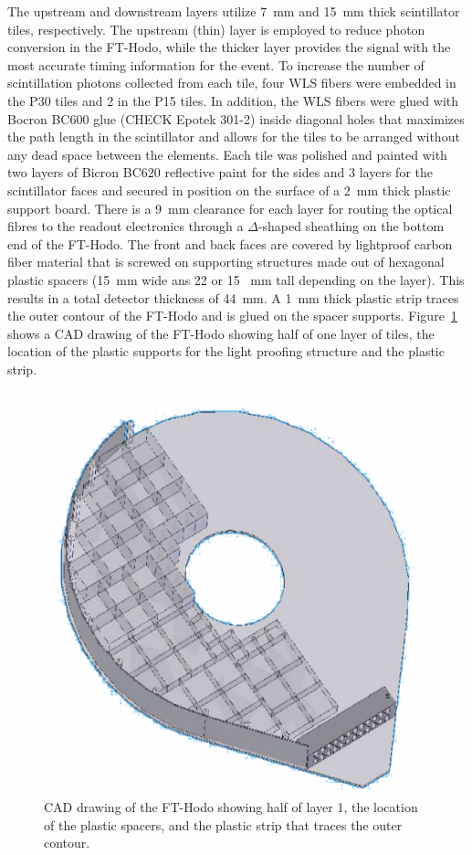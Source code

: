 The upstream and downstream layers utilize 7~mm and 15~mm thick scintillator tiles, respectively. The upstream (thin) layer is employed to reduce photon conversion in the FT-Hodo, while the thicker layer provides the signal with the most accurate timing information for the event. To increase the number of scintillation photons collected from each tile, four WLS fibers were embedded in the P30 tiles and 2 in the P15 tiles. In addition, the WLS fibers were glued with Bocron BC600 glue (CHECK Epotek 301-2) inside diagonal holes that maximizes the path length in the scintillator and allows for the tiles to be arranged without any dead space between the elements. Each tile was polished and painted with two layers of Bicron BC620 reflective paint for the sides and 3 layers for the scintillator faces and secured in position on the surface of a 2~mm thick plastic support board. There is a 9~mm clearance for each layer for routing the optical fibres to the readout electronics through a $\Delta$-shaped sheathing on the bottom end of the FT-Hodo. The front and back faces are covered by lightproof carbon fiber material that is screwed on supporting structures made out of hexagonal plastic spacers (15~mm wide ans 22 or 15 ~mm tall depending on the layer). This results in a total detector thickness of 44~mm. A 1~mm thick plastic strip traces the outer contour of the FT-Hodo and is glued on the spacer supports. Figure~\ref{Fig:CADFT-Hodo} shows a CAD drawing of the FT-Hodo showing half of one layer of tiles, the location of the plastic supports for the light proofing structure and the plastic strip.  
\begin{figure}[th!]
\centering 
\includegraphics[width=0.85\columnwidth]{./fig/CADFT-Hodo.pdf} 
\caption{CAD drawing of the FT-Hodo showing half of layer 1, the location of the plastic spacers, and the plastic strip that traces the outer contour. } 
\label{Fig:CADFT-Hodo} 
\end{figure}

